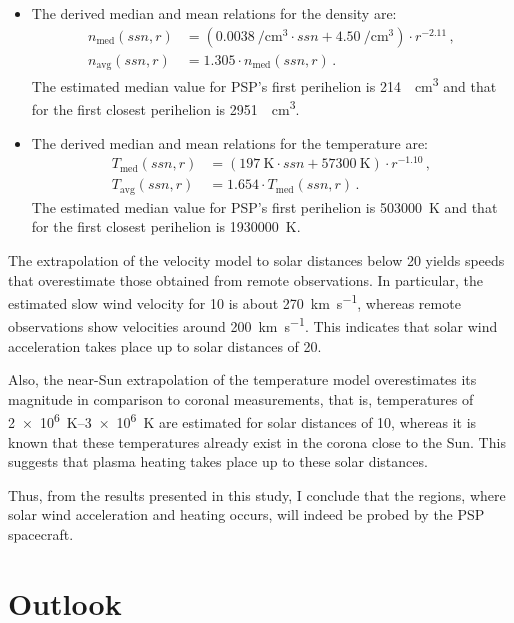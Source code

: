 \begin{itemize}
	\item The derived median and mean relations for the density are:
	\begin{align*}
		n_\text{med}(ssn,r) &= \left(\SI{0.0038}{\per\cm\cubed} \cdot ssn + \SI{4.50}{\per\cm\cubed}\right) \cdot r^{-2.11}	\,,\\
		n_\text{avg}(ssn,r) &= 1.305 \cdot n_\text{med}(ssn,r)	\,.
	\end{align*}
	 The estimated median value for PSP's first perihelion is \SI{214}{\per\cm\cubed} and that for the first closest perihelion is \SI{2951}{\per\cm\cubed}.
	
	\item The derived median and mean relations for the temperature are:
	\begin{align*}
		T_\text{med}(ssn,r) &= (\SI{197}{\K} \cdot ssn + \SI{57300}{\K}) \cdot r^{-1.10}	\,,\\
		T_\text{avg}(ssn,r) &= 1.654 \cdot T_\text{med}(ssn,r)\,.
	\end{align*}
	 The estimated median value for PSP's first perihelion is \SI{503000}{\kelvin} and that for the first closest perihelion is \SI{1930000}{\kelvin}.
\end{itemize}

The extrapolation of the velocity model to solar distances below \SI{20}{\Rs} yields speeds that overestimate those obtained from remote observations. In particular, the estimated slow wind velocity for \SI{10}{\Rs} is about \SI{270}{\km\per\s}, whereas remote observations show velocities around \SI{200}{\km\per\s}. This indicates that solar wind acceleration takes place up to solar distances of \SI{20}{\Rs}.

Also, the near-Sun extrapolation of the temperature model overestimates its magnitude in comparison to coronal measurements, that is, temperatures of \SIrange{2e6}{3e6}{\kelvin} are estimated for solar distances of \SI{10}{\Rs}, whereas it is known that these temperatures already exist in the corona close to the Sun. This suggests that plasma heating takes place up to these solar distances.

Thus, from the results presented in this study, I conclude that the regions, where solar wind acceleration and heating occurs, will indeed be probed by the PSP spacecraft.


\section{Outlook}

